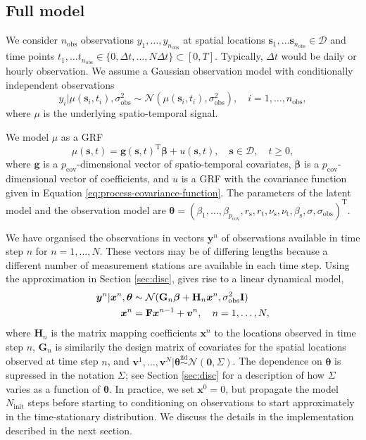 \documentclass[12pt]{article} %
\begin{document}
\subsection{Full model}\label{sec:hierFull}
We consider $n_{\mathrm{obs}} $ observations $y_1, \ldots, y_{n_{\mathrm{obs}}}$ at spatial locations $\boldsymbol{s}_1, \ldots \boldsymbol{s}_{n_\mathrm{obs}}\in \mathcal{D}$ and time points
$t_1, \ldots t_{n_{\mathrm{obs}}}\in\{0, \Delta t, \ldots, N\Delta t\}\subset[0,T]$. Typically, $\Delta t$ would be daily or hourly observation.  We assume a Gaussian observation model with conditionally independent observations
\[
    y_i|\mu(\boldsymbol{s}_i, t_i), \sigma_{\mathrm{obs}}^2 \sim \mathcal{N}(\mu(\boldsymbol{s}_i, t_i), \sigma_{\mathrm{obs}}^2), \quad i = 1, \ldots, n_{\mathrm{obs}},
\]
where 
$\mu$ is the underlying spatio-temporal signal.

We model $\mu$ as a GRF
\[
    \mu(\boldsymbol{s}, t) = \boldsymbol{g}(\boldsymbol{s},t)^\mathrm{T}\boldsymbol{\beta}+u(\boldsymbol{s}, t), \quad \boldsymbol{s}\in\mathcal{D}, \quad t\geq 0,
\]
where $\boldsymbol{g}$ is a $p_{\mathrm{cov}}$-dimensional vector of spatio-temporal covariates, $\boldsymbol{\beta}$ is a $p_{\mathrm{cov}}$-dimensional vector of coefficients, and
$u$ is a GRF with the covariance function given in Equation
\eqref{eq:process-covariance-function}. The parameters of the latent model and the observation model are $\boldsymbol{\theta} = (\beta_1, \ldots, \beta_{p_{\mathrm{cov}}}, r_\mathrm{s}, r_\mathrm{t}, \nu_\mathrm{s},\nu_\mathrm{t}, \beta_\mathrm{s}, \sigma, \sigma_{\mathrm{obs}})^\mathrm{T}$.

We have organised the observations in vectors $\boldsymbol{y}^n$ of observations available in time step $n$ for $n = 1, \ldots, N$. These vectors may be of differing lengths because a different number of measurement stations are available in each time step. Using the approximation in Section \ref{sec:disc},  gives rise to a linear dynamical model,
\begin{align}
    \boldsymbol{y}^n|\boldsymbol{x}^n, \boldsymbol{\theta} &\sim \mathcal{N}(\mathbf{G}_n\boldsymbol{\beta}+\mathbf{H}_n\boldsymbol{x}^n, \sigma_{\mathrm{obs}}^2\mathbf{I}) \notag \\
    \boldsymbol{x}^n &= \mathbf{F}\boldsymbol{x}^{n-1} + \boldsymbol{v}^n, \quad n = 1, \ldots, N, \label{eq:LinDynModel}
\end{align}
where $\mathbf{H}_n$ is the matrix mapping coefficients $\boldsymbol{x}^n$ to the locations observed in time step $n$, $\mathbf{G}_n$ is similarily the design matrix of covariates for the spatial locations observed at time step $n$, and $\boldsymbol{v}^1,\ldots,\boldsymbol{v}^N|\boldsymbol{\theta} \overset{\text{iid}}{\sim}\mathcal{N}(\boldsymbol{0}, \Sigma)$. The dependence on $\boldsymbol{\theta}$ is supressed in the notation $\Sigma$; see Section \ref{sec:disc} for a description of how $\Sigma$ varies as a function of $\boldsymbol{\theta}$. In practice, we set $\boldsymbol{x}^0 = 0$, but propagate the model $N_{\mathrm{init}}$ steps before starting to conditioning on observations to start approximately in the time-stationary distribution. We discuss the details in the implementation described in the next section.
\end{document}
